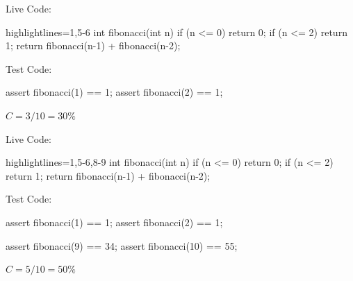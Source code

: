 \documentclass{article}
\begin{document}



\begin{multicols}{2}
Live Code:\par
{\small\begin{ffcode*}{highlightlines={1,5-6}}
int fibonacci(int n) {
  if (n <= 0) {
    return 0;
  }
  if (n <= 2) {
    return 1;
  }
  return fibonacci(n-1)
    + fibonacci(n-2);
}
\end{ffcode*}
}
\par\columnbreak\par
Test Code:\par
{\small\begin{ffcode*}{}
assert fibonacci(1) == 1;
assert fibonacci(2) == 1;
\end{ffcode*}
}
\( C = 3/10 = 30\% \)
\end{multicols}
\plush{}

\begin{multicols}{2}
Live Code:\par
{\small\begin{ffcode*}{highlightlines={1,5-6,8-9}}
int fibonacci(int n) {
  if (n <= 0) {
    return 0;
  }
  if (n <= 2) {
    return 1;
  }
  return fibonacci(n-1)
    + fibonacci(n-2);
}
\end{ffcode*}
}
\par\columnbreak\par
Test Code:\par
{\small\begin{ffcode*}{}
assert fibonacci(1) == 1;
assert fibonacci(2) == 1;

assert fibonacci(9) == 34;
assert fibonacci(10) == 55;
\end{ffcode*}
}
\( C = 5/10 = 50\% \)
\end{multicols}
\plush{}

\end{document}
